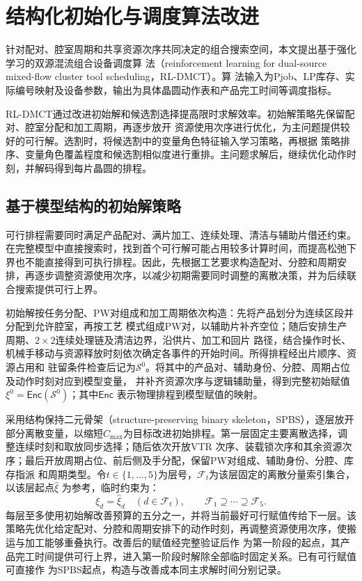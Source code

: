 \chapter{结构化初始化与调度算法改进}

\label{sec:algorithm-cn}

针对配对、腔室周期和共享资源次序共同决定的组合搜索空间，本文提出基于强化学习的双源混流组合设备调度算
法（reinforcement learning for dual-source mixed-flow cluster tool scheduling，RL-DMCT）。算
法输入为Pjob、LP库存、实际编号映射及设备参数，输出为具体晶圆动作表和产品完工时间等调度指标。

RL-DMCT通过改进初始解和候选割选择提高限时求解效率。初始解策略先保留配对、腔室分配和加工周期，再逐步放开
资源使用次序进行优化，为主问题提供较好的可行解。选割时，将候选割中的变量角色特征输入学习策略，再根据
策略排序、变量角色覆盖程度和候选割相似度进行重排。主问题求解后，继续优化动作时刻，并解码得到每片晶圆的排程。

\section{基于模型结构的初始解策略}
\label{sec:pjob-encoding-cn}

可行排程需要同时满足产品配对、满片加工、连续处理、清洁与辅助片借还约束。在完整模型中直接搜索时，找到首个可行解可能占用较多计算时间，而提高松弛下界也不能直接得到可执行排程。因此，先根据工艺要求构造配对、分腔和周期安排，再逐步调整资源使用次序，以减少初期需要同时调整的离散决策，并为后续联合搜索提供可行上界。

初始解按任务分配、PW对组成和加工周期依次构造：先将产品划分为连续区段并分配到允许腔室，再按工艺
模式组成PW对，以辅助片补齐空位；随后安排生产周期、$2\times2$连续处理链及清洁边界，沿供片、加工和回片
路径，结合操作时长、机械手移动与资源释放时刻依次确定各事件的开始时间。所得排程经出片顺序、资源占用和
驻留条件检查后记为$\mathcal S^0$。将其中的产品对、辅助身份、分腔、周期占位及动作时刻对应到模型变量，
并补齐资源次序与逻辑辅助量，得到完整初始赋值$\xi^0=\mathsf{Enc}(\mathcal S^0)$；其中$\mathsf{Enc}$
表示物理排程到模型赋值的映射。

采用结构保持二元骨架（structure-preserving binary skeleton，SPBS），逐层放开部分离散变量，以缩短$C_{\max}$为目标改进初始排程。第一层固定主要离散选择，调整连续时刻和取放同步选择；随后依次开放VTR
次序、装载锁次序和其余资源次序；最后开放周期占位、前后侧及手分配，保留PW对组成、辅助身份、分腔、库存指派
和周期类型。令$t\in\{1,\ldots,5\}$为层号，$\mathcal F_t$为该层固定的离散分量索引集合，以该层起点$\widehat\xi$
为参考，临时约束为：
\begin{equation}
\xi_d=\widehat\xi_d\quad(d\in\mathcal F_t),\qquad
\mathcal F_1\supseteq\cdots\supseteq\mathcal F_5.
\label{eq:spbs-fix-cn}
\end{equation}
每层至多使用初始解改善预算的五分之一，并将当前最好可行赋值传给下一层。该策略先优化给定配对、分腔和周期安排下的动作时刻，再调整资源使用次序，使搬运与加工能够重叠执行。改善后的赋值经完整验证后作
为第一阶段的起点，其产品完工时间提供可行上界，进入第一阶段时解除全部临时固定关系。已有可行赋值可直接作
为SPBS起点，构造与改善成本同主求解时间分别记录。


